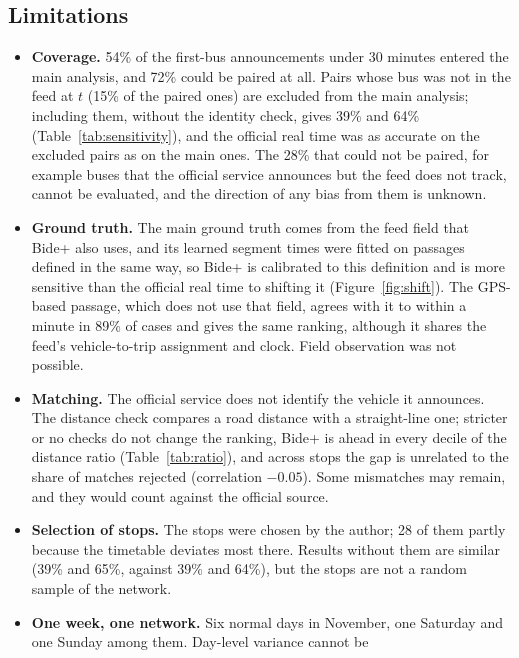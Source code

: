 \subsection{Limitations}

\begin{itemize}
  \item \textbf{Coverage.} 54\% of the first-bus announcements under 30 minutes entered the main analysis, and 72\% could be
        paired at all. Pairs whose bus was not in the feed at $t$ (15\% of the paired ones) are excluded from the main
        analysis; including them, without the identity check, gives 39\% and 64\% (Table~\ref{tab:sensitivity}), and the
        official real time was as accurate on the excluded pairs as on the main ones. The 28\% that could not be paired,
        for example buses that the official service announces but the feed does not track, cannot be evaluated, and the
        direction of any bias from them is unknown.
  \item \textbf{Ground truth.} The main ground truth comes from the feed field that Bide+ also uses, and its learned
        segment times were fitted on passages defined in the same way, so Bide+ is calibrated to this definition and is
        more sensitive than the official real time to shifting it (Figure~\ref{fig:shift}). The GPS-based passage, which
        does not use that field, agrees with it to within a minute in 89\% of cases and gives the same ranking, although
        it shares the feed's vehicle-to-trip assignment and clock. Field
        observation was not possible.
  \item \textbf{Matching.} The official service does not identify the vehicle it announces. The distance check compares
        a road distance with a straight-line one; stricter or no checks do not change the ranking, Bide+ is ahead in every
        decile of the distance ratio (Table~\ref{tab:ratio}), and across stops the gap is unrelated to the share of matches
        rejected (correlation $-0.05$). Some mismatches may remain, and they would count against the official source.
  \item \textbf{Selection of stops.} The stops were chosen by the author; 28 of them partly because the timetable deviates
        most there. Results without them are similar (39\% and 65\%, against 39\% and 64\%), but the stops are not a random sample of the
        network.
  \item \textbf{One week, one network.} Six normal days in November, one Saturday and one Sunday among them. Day-level variance cannot be

\end{itemize}
